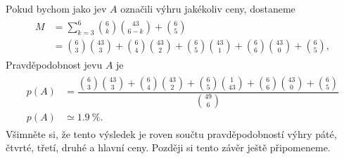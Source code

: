 \begin{mdframed}[style=mdexam]
\begin{example}
\begin{itemize}[leftmargin=10pt,noitemsep]
            Pokud bychom jako jev \(A\) označili výhru jakékoliv ceny, dostaneme
            \begin{gather*}
              \begin{align*}
              M  &= \sum_{k=3}^{6}\binom{6}{k}\binom{43}{6-k} + \binom{6}{5}                      \\
                 &= \binom{6}{3}\binom{43}{3} + \binom{6}{4}\binom{43}{2} + 
                    \binom{6}{5}\binom{43}{1} + \binom{6}{6}\binom{43}{0} + \binom{6}{5},   
              \end{align*}    
            \end{gather*}  
            Pravděpodobnost jevu \(A\) je    
            \begin{gather*}
              \begin{align*}
                p(A) &= \dfrac{\binom{6}{3}\binom{43}{3}+\binom{6}{4}\binom{43}{2}+
                               \binom{6}{5}\binom{1}{43}+\binom{6}{6}\binom{43}{0}+\binom{6}{5}}
                              {\binom{49}{6}}                                                    \\
                p(A) &\simeq\qty{1.9}{\percent}.
              \end{align*}    
            \end{gather*}
            Všimněte si, že tento výsledek je roven součtu pravděpodobností výhry páté, čtvrté,
            třetí, druhé a hlavní ceny. Později si tento závěr ještě připomeneme.
    \end{itemize}  
  \end{example}
\end{mdframed}